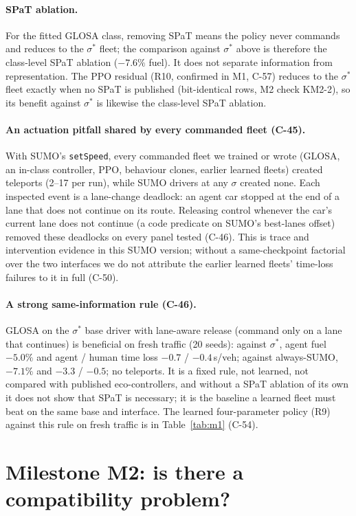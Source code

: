 \documentclass[11pt]{article}
\begin{document}
\paragraph{SPaT ablation.} For the fitted GLOSA class, removing SPaT means the policy never commands and reduces to the
$\sigma^*$ fleet; the comparison against $\sigma^*$ above is therefore the class-level SPaT ablation ($-7.6\%$ fuel). It does not separate
information from representation. The PPO residual (R10, confirmed in M1, C-57) reduces to the $\sigma^*$ fleet exactly when no SPaT is
published (bit-identical rows, M2 check KM2-2), so its benefit against $\sigma^*$ is likewise the class-level SPaT ablation.
\paragraph{An actuation pitfall shared by every commanded fleet (C-45).} With SUMO's \texttt{setSpeed}, every commanded fleet we
trained or wrote (GLOSA, an in-class controller, PPO, behaviour clones, earlier learned fleets) created teleports (2--17 per run), while
SUMO drivers at any $\sigma$ created none. Each inspected event is a lane-change deadlock: an agent car stopped at the end of a lane that does
not continue on its route. Releasing control whenever the car's current lane does not continue (a code predicate on SUMO's best-lanes
offset) removed these deadlocks on every panel tested (C-46). This is trace and intervention evidence in this SUMO version; without a
same-checkpoint factorial over the two interfaces we do not attribute the earlier learned fleets' time-loss failures to it in full (C-50).
\paragraph{A strong same-information rule (C-46).} GLOSA on the $\sigma^*$ base driver with lane-aware release (command only on a lane
that continues) is beneficial on fresh traffic (20 seeds): against $\sigma^*$, agent fuel $-5.0\%$ and agent / human time loss $-0.7$ /
$-0.4$\,s/veh; against always-SUMO, $-7.1\%$ and $-3.3$ / $-0.5$; no teleports. It is a fixed rule, not learned, not compared with
published eco-controllers, and without a SPaT ablation of its own it does not show that SPaT is necessary; it is the baseline a learned
fleet must beat on the same base and interface.
The learned four-parameter policy (R9) against this rule on fresh traffic is in Table~\ref{tab:m1} (C-54).

\section{Milestone M2: is there a compatibility problem?}
\end{document}
